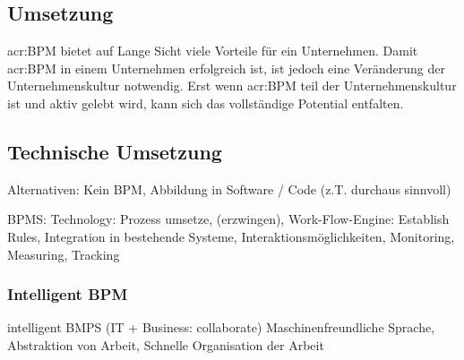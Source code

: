 \subsection{Umsetzung}
\gls{acr:BPM} bietet auf Lange Sicht viele Vorteile für ein Unternehmen. Damit \gls{acr:BPM} in einem Unternehmen erfolgreich ist, ist jedoch eine Veränderung der Unternehmenskultur notwendig. Erst wenn \gls{acr:BPM} teil der Unternehmenskultur ist und aktiv gelebt wird, kann sich das vollständige Potential entfalten.

\subsection{Technische Umsetzung}
Alternativen: Kein BPM, Abbildung in Software / Code (z.T. durchaus sinnvoll)


BPMS: Technology: Prozess umsetze, (erzwingen), Work-Flow-Engine: Establish Rules, Integration in bestehende Systeme, Interaktionsmöglichkeiten, Monitoring, Measuring, Tracking

\subsubsection{Intelligent BPM}

intelligent BMPS (IT + Business: collaborate)
Maschinenfreundliche Sprache, Abstraktion von Arbeit, Schnelle Organisation der Arbeit
